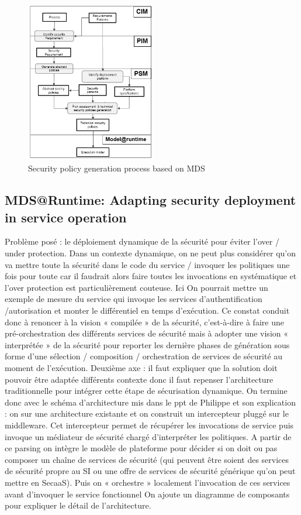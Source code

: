 \documentclass[runningheads,a4paper]{llncs}
\begin{document}
\begin{figure}  
\centering
\includegraphics[height=200pt, width=160pt]{mds.png}
\caption{Security policy generation process based on MDS}
\label{fig:mds}
\end{figure}




\subsection{MDS@Runtime: Adapting security deployment in service operation}
Probl\`eme pos\'e : le d\'eploiement dynamique de la s\'ecurit\'e pour \'eviter l’over / under protection. Dans un contexte dynamique, on ne peut plus consid\'erer qu’on va mettre toute la s\'ecurit\'e dans le code du service / invoquer les politiques  une fois pour toute car il faudrait alors faire toutes les invocations en syst\'ematique et l’over protection est particuli\`erement couteuse. Ici On pourrait mettre un exemple de mesure du service qui invoque les services d’authentification /autorisation et monter le diff\'erentiel en temps d’ex\'ecution. Ce constat conduit donc \`a renoncer \`a la vision « compil\'ee » de la s\'ecurit\'e, c’est-\`a-dire \`a faire une pr\'e-orchestration des diff\'erents services de s\'ecurit\'e mais \`a adopter une vision « interpr\'et\'ee » de la s\'ecurit\'e pour reporter les derni\`ere phases de g\'en\'eration sous forme d’une s\'election / composition / orchestration de services de s\'ecurit\'e au moment de l’ex\'ecution.
Deuxi\`eme axe : il faut expliquer que la solution doit pouvoir \^etre adapt\'ee  diff\'erents contexte donc il faut repenser l’architecture traditionnelle pour int\'egrer cette \'etape de s\'ecurisation dynamique. On termine donc avec le sch\'ema d’architecture mis dans le ppt de Philippe et son explication : on sur une architecture existante et on construit  un intercepteur plugg\'e sur le middleware. Cet intercepteur permet de r\'ecup\'erer les invocations de service puis invoque un m\'ediateur de s\'ecurit\'e charg\'e d’interpr\'eter les politiques. A partir de ce parsing on int\`egre le mod\`ele de plateforme pour d\'ecider si on doit ou pas composer un chaîne de services de s\'ecurit\'e (qui peuvent \^etre soient des services de s\'ecurit\'e propre au SI ou une offre de services de s\'ecurit\'e g\'en\'erique qu’on peut mettre en SecaaS). Puis on « orchestre » localement l’invocation de ces services avant d’invoquer le service fonctionnel
On ajoute un diagramme de composants pour expliquer le d\'etail de l’architecture.
\end{document}

